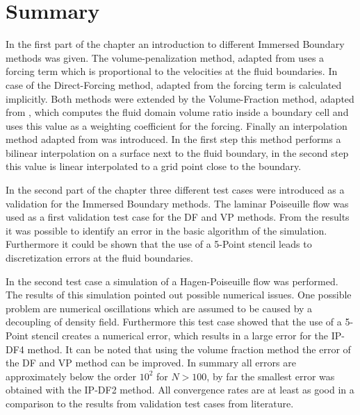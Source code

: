 


\clearpage

\section{Summary}

In the first part of the chapter an introduction to different Immersed Boundary methods was given.
The volume-penalization method, adapted from  \citep{Lulff2011} uses a forcing term which is proportional to the velocities at the fluid boundaries.
In case of the Direct-Forcing method, adapted from \citep{Fadlun2000} the forcing term is calculated implicitly.
Both methods were extended by the Volume-Fraction method, adapted from \citep{Fadlun2000}, which computes the fluid domain volume ratio inside a boundary
cell and uses this value as a weighting coefficient for the forcing.
Finally an interpolation method adapted from  \citep{ Gilmanov2003} was introduced. In the first step this method performs a bilinear interpolation on a surface
next to the fluid boundary, in the second step this value is linear interpolated to a grid point close to the boundary.

In the second part of the chapter three different test cases were introduced as a validation for the Immersed Boundary methods.
The laminar Poiseuille flow was used as a first validation test case for the DF and VP methods.
From the results it was possible to identify an error in the basic algorithm of the simulation.
Furthermore it could be shown that the use of a 5-Point stencil leads to discretization errors at the fluid boundaries.

In the second test case a simulation of a Hagen-Poiseuille flow was performed.
The results of this simulation pointed out possible numerical issues.
One possible problem are numerical oscillations which are assumed to be caused
by a decoupling of density field.
Furthermore this test case showed that the use of a 5-Point stencil creates a numerical error,
which results in a large error for the IP-DF4 method.
It can be noted that using the volume fraction method  the error of the DF and VP method can be improved.
In summary all errors are approximately below the order  $10^2$ for $N>100$,
by far the smallest error was obtained with the IP-DF2 method.
All convergence rates are at least as good in a comparison
to the results from validation test cases from literature.

